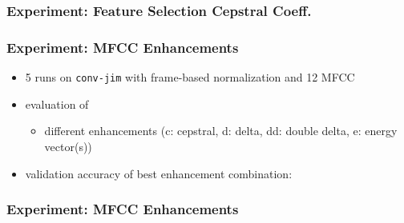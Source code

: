 \begin{frame}
  \frametitle{Experiment: Feature Selection Cepstral Coeff.}
  
\end{frame}

\begin{frame}
  \frametitle{Experiment: MFCC Enhancements}
  \begin{itemize}
    \item 5 runs on \texttt{conv-jim} with frame-based normalization and 12 MFCC
    \item evaluation of
    \begin{itemize}
     \item different enhancements (c: cepstral, d: delta, dd: double delta, e: energy vector(s))
    \end{itemize}
    \item validation accuracy of best enhancement combination:
  \end{itemize}
  \vspace{-0.5cm}
  \begin{figure}[!ht]
    \centering
  \end{figure}
\end{frame}

\begin{frame}
  \frametitle{Experiment: MFCC Enhancements}
  
\end{frame}

